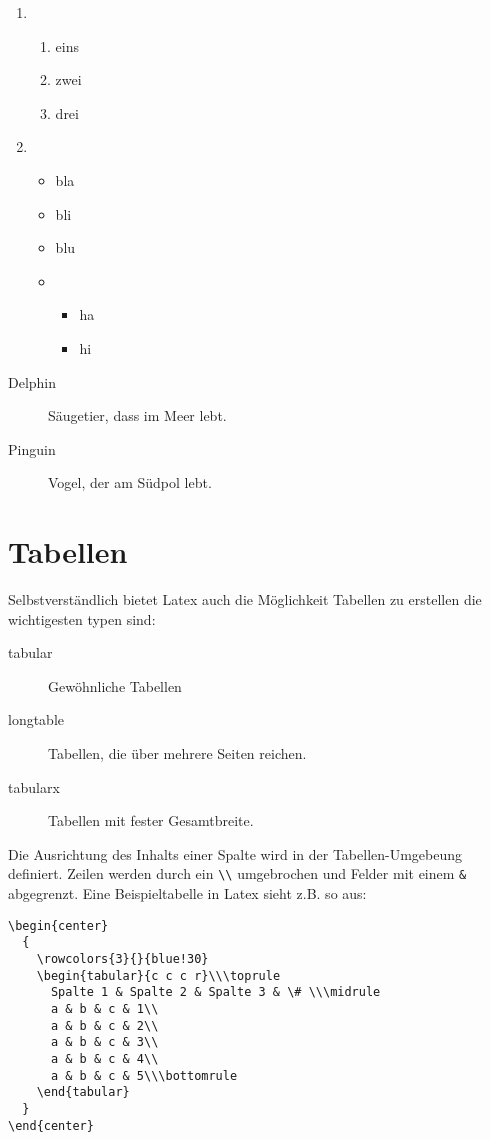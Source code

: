 \begin{enumerate}
\item
  \begin{enumerate}
  \item eins
  \item zwei
  \item drei
  \end{enumerate}
\item
  \begin{itemize}
  \item bla
  \item bli
  \item blu
  \item
    \begin{itemize}
    \item ha
    \item hi
    \end{itemize}
  \end{itemize}
\end{enumerate}
\begin{description}
\item[Delphin] Säugetier, dass im Meer lebt.
\item[Pinguin] Vogel, der am Südpol lebt. 
\end{description}

\section{Tabellen}
Selbstverständlich bietet Latex auch die Möglichkeit Tabellen zu erstellen die wichtigesten typen sind:
\begin{description}
\item[tabular] Gewöhnliche Tabellen
\item[longtable] Tabellen, die über mehrere Seiten reichen.
\item[tabularx] Tabellen mit fester Gesamtbreite.
\end{description}
Die Ausrichtung des Inhalts einer Spalte wird in der Tabellen-Umgebeung definiert. Zeilen werden durch ein
\verb+\\+ umgebrochen und Felder mit einem \verb+&+ abgegrenzt. Eine Beispieltabelle in Latex sieht z.B. so aus:
\begin{verbatim}
\begin{center}
  {
    \rowcolors{3}{}{blue!30}
    \begin{tabular}{c c c r}\\\toprule
      Spalte 1 & Spalte 2 & Spalte 3 & \# \\\midrule
      a & b & c & 1\\
      a & b & c & 2\\
      a & b & c & 3\\
      a & b & c & 4\\
      a & b & c & 5\\\bottomrule
    \end{tabular}
  }
\end{center}
\end{verbatim}

